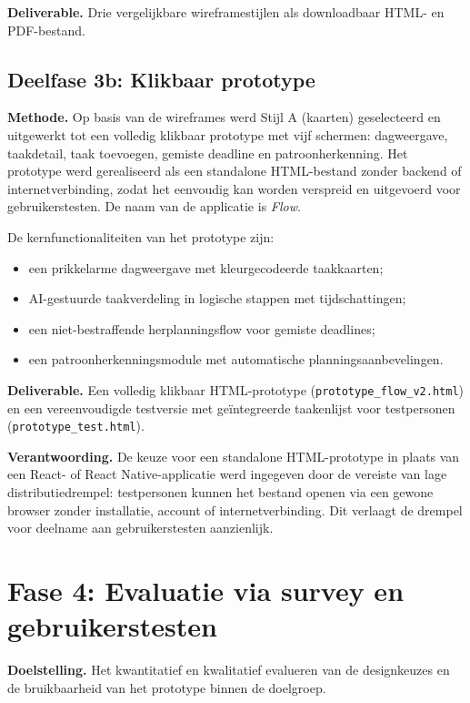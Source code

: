 \textbf{Deliverable.}
Drie vergelijkbare wireframestijlen als downloadbaar HTML- en PDF-bestand.

\subsection{Deelfase 3b: Klikbaar prototype}

\textbf{Methode.}
Op basis van de wireframes werd Stijl A (kaarten) geselecteerd en uitgewerkt tot
een volledig klikbaar prototype met vijf schermen: dagweergave, taakdetail,
taak toevoegen, gemiste deadline en patroonherkenning. Het prototype werd
gerealiseerd als een standalone HTML-bestand zonder backend of
internetverbinding, zodat het eenvoudig kan worden verspreid en uitgevoerd
voor gebruikerstesten. De naam van de applicatie is \textit{Flow}.

De kernfunctionaliteiten van het prototype zijn:
\begin{itemize}
  \item een prikkelarme dagweergave met kleurgecodeerde taakkaarten;
  \item AI-gestuurde taakverdeling in logische stappen met tijdschattingen;
  \item een niet-bestraffende herplanningsflow voor gemiste deadlines;
  \item een patroonherkenningsmodule met automatische planningsaanbevelingen.
\end{itemize}

\textbf{Deliverable.}
Een volledig klikbaar HTML-prototype (\texttt{prototype\_flow\_v2.html}) en een
vereenvoudigde testversie met geïntegreerde taakenlijst voor testpersonen
(\texttt{prototype\_test.html}).

\textbf{Verantwoording.}
De keuze voor een standalone HTML-prototype in plaats van een React- of
React Native-applicatie werd ingegeven door de vereiste van lage distributiedrempel:
testpersonen kunnen het bestand openen via een gewone browser zonder installatie,
account of internetverbinding. Dit verlaagt de drempel voor deelname aan
gebruikerstesten aanzienlijk.

\section{Fase 4: Evaluatie via survey en gebruikerstesten}

\textbf{Doelstelling.}
Het kwantitatief en kwalitatief evalueren van de designkeuzes en de bruikbaarheid
van het prototype binnen de doelgroep.

